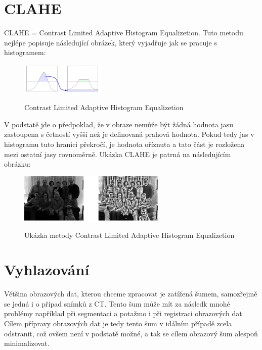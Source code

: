 \documentclass{thesis}%
\begin{document}
\section{CLAHE}
CLAHE = Contrast Limited Adaptive Histogram Equalizetion. Tuto metodu nejlépe popisuje následující obrázek, který vyjadřuje jak se pracuje s histogramem:
 \begin{figure}[htp!]
  \centering
  
   \includegraphics[width=4cm]{clahe.png}\\ 
    \caption[CLAHE]{Contrast Limited Adaptive Histogram Equalizetion}
\end{figure}
V podstatě jde o předpoklad, že v obraze nemůže být žádná hodnota jasu zastoupena s četností vyšší než je definovaná prahová hodnota. Pokud tedy jas v histogramu tuto hranici překročí, je hodnota oříznuta a tato část je rozložena mezi ostatní jasy rovnoměrně. Ukázka CLAHE je patrná na následujícím obrázku:
 \begin{figure}[htp!]
  \centering
   \includegraphics[width=7cm]{clahe2.png}\\ 
    \caption[CLAHE ukázka]{Ukázka metody Contrast Limited Adaptive Histogram Equalizetion}
\end{figure}
\section{Vyhlazování}
Většina obrazových dat, kterou chceme zpracovat je zatížená šumem, samozřejmě se jedná i o případ snímků z CT. Tento šum může mít za následk mnohé problémy například při segmentaci a potažmo i při registraci obrazových dat. Cílem přípravy obrazových dat je tedy tento šum v idálním případě zcela odstranit, což ovšem není v podstatě možné, a tak se cílem obrazový šum alespoň minimalizovat.\\
\end{document}
